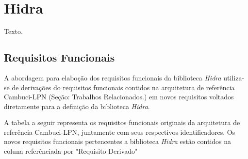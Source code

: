 \chapter{Hidra} \label{chapter:hidra}

Texto.

\section{Requisitos Funcionais} \label{section:sec1}

A abordagem para elaboção dos requisitos funcionais da biblioteca \textit{ Hidra} utiliza-se de derivações do requisitos funcionais contidos na arquitetura de referência Cambuci-LPN (Seção: Trabalhos Relacionados.) em novos requisitos voltados diretamente para a definição da biblioteca \textit{ Hidra}.

A tabela a seguir representa os requisitos funcionais originais da arquitetura de referência Cambuci-LPN, juntamente com seus respectivos identificadores. Os novos requisitos funcionais pertencentes a biblioteca \textit{ Hidra} estão contidos na coluna referênciada por "Requisito Derivado"


